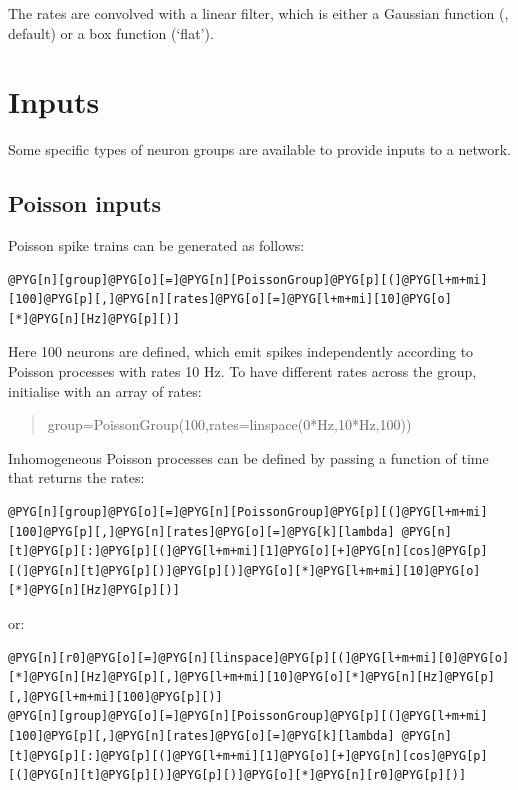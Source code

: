 \documentclass[letterpaper,10pt,english]{manual}
\begin{document}
The rates are convolved with a linear filter, which is either a Gaussian function
(, default) or a box function (`flat').

\resetcurrentobjects
\hypertarget{--doc-inputs}{}

\section{Inputs}

Some specific types of neuron groups are available to provide inputs to a network.


\subsection{Poisson inputs}

Poisson spike trains can be generated as follows:

\begin{Verbatim}[commandchars=@\[\]]
@PYG[n][group]@PYG[o][=]@PYG[n][PoissonGroup]@PYG[p][(]@PYG[l+m+mi][100]@PYG[p][,]@PYG[n][rates]@PYG[o][=]@PYG[l+m+mi][10]@PYG[o][*]@PYG[n][Hz]@PYG[p][)]
\end{Verbatim}

Here 100 neurons are defined, which emit spikes independently according to Poisson
processes with rates 10 Hz. To have different rates across the group,
initialise with an array of rates:
\begin{quote}

group=PoissonGroup(100,rates=linspace(0*Hz,10*Hz,100))
\end{quote}

Inhomogeneous Poisson processes can be defined by passing a function of time that returns the
rates:

\begin{Verbatim}[commandchars=@\[\]]
@PYG[n][group]@PYG[o][=]@PYG[n][PoissonGroup]@PYG[p][(]@PYG[l+m+mi][100]@PYG[p][,]@PYG[n][rates]@PYG[o][=]@PYG[k][lambda] @PYG[n][t]@PYG[p][:]@PYG[p][(]@PYG[l+m+mi][1]@PYG[o][+]@PYG[n][cos]@PYG[p][(]@PYG[n][t]@PYG[p][)]@PYG[p][)]@PYG[o][*]@PYG[l+m+mi][10]@PYG[o][*]@PYG[n][Hz]@PYG[p][)]
\end{Verbatim}

or:

\begin{Verbatim}[commandchars=@\[\]]
@PYG[n][r0]@PYG[o][=]@PYG[n][linspace]@PYG[p][(]@PYG[l+m+mi][0]@PYG[o][*]@PYG[n][Hz]@PYG[p][,]@PYG[l+m+mi][10]@PYG[o][*]@PYG[n][Hz]@PYG[p][,]@PYG[l+m+mi][100]@PYG[p][)]
@PYG[n][group]@PYG[o][=]@PYG[n][PoissonGroup]@PYG[p][(]@PYG[l+m+mi][100]@PYG[p][,]@PYG[n][rates]@PYG[o][=]@PYG[k][lambda] @PYG[n][t]@PYG[p][:]@PYG[p][(]@PYG[l+m+mi][1]@PYG[o][+]@PYG[n][cos]@PYG[p][(]@PYG[n][t]@PYG[p][)]@PYG[p][)]@PYG[o][*]@PYG[n][r0]@PYG[p][)]
\end{Verbatim}
\end{document}
